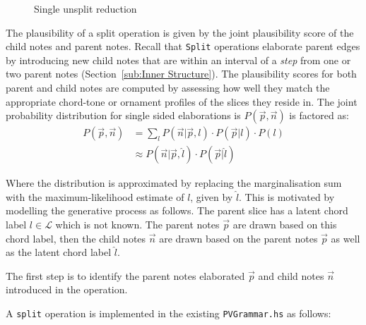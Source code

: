 \documentclass[12pt,a4paper,twoside,openany]{report} \usepackage[pdfborder={0 0 0}]{hyperref}    %
\theoremstyle{definition} \newtheorem{definition}{Definition}[section]
\begin{document}
\begin{figure}[ht]
\begin{subfigure}[t]{.49\textwidth}
    \label{fig:reductionAfter} \end{subfigure}
  \captionsetup{width=.9\linewidth} \caption{Single unsplit reduction} \label{fig:reductionStep} 
  \end{figure} 

    The plausibility of a split operation is given by the joint plausibility score of the child notes and parent notes. 
    Recall that \texttt{Split} operations elaborate parent edges by introducing new child notes that are within an interval of
    a \textit{step} from one or two parent notes (Section~\ref{sub:Inner Structure}). The plausibility scores for both parent and child notes are computed
    by assessing how well they match the appropriate chord-tone or ornament profiles of the slices they reside in.
    The joint probability distribution for single sided elaborations is $P(\vec{p},\vec{n})$ is factored as:
    \begin{equation}
      \begin{aligned}
        P(\vec{p},\vec{n}) &= \sum\limits_l P(\vec{n}| \vec{p}, l)\cdot P(\vec{p} | l) \cdot P(l)\\
                           &\approx P(\vec{n}| \vec{p}, \hat{l})\cdot P(\vec{p} | \hat{l}) 
      \end{aligned}
    \end{equation}

    Where the distribution is approximated by replacing the marginalisation sum with the maximum-likelihood estimate of
    $l$, given by $\hat{l}$. This is motivated by modelling the generative process as follows.
    The parent slice has a latent chord label $l \in \mathcal{L}$ which is not known. The parent notes $\vec{p}$ are
    drawn based on this chord label, then the child notes $\vec{n}$ are drawn based on the parent notes $\vec{p}$ as
    well as the latent chord label $\hat{l}$. 

    The first step is to identify the parent notes elaborated $\vec{p}$ and child notes $\vec{n}$ introduced in the
    operation.

    A \texttt{split} operation is implemented in the existing \texttt{PVGrammar.hs} as follows:
\end{document}
